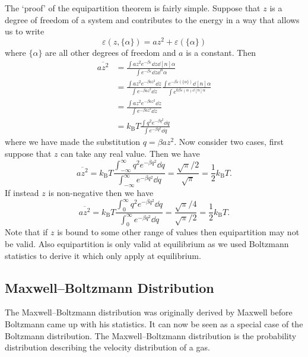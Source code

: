 \documentclass[a4paper]{article}
\newcommand{\boltzmann}{k_\mathrm{B}}
\newcommand{\mean}[1]{\overline{#1}}
\begin{document}
    The `proof' of the equipartition theorem is fairly simple.
    Suppose that \(z\) is a degree of freedom of a system and contributes to the energy in a way that allows us to write
    \[\varepsilon(z, \{\alpha\}) = az^2 + \varepsilon(\{\alpha\})\]
    where \(\{\alpha\}\) are all other degrees of freedom and \(a\) is a constant.
    Then
    \begin{align*}
        \mean{az^2} &= \frac{\int az^2e^{-\beta\varepsilon}\dd{z}\dd[n]{\alpha}}{\int e^{-\beta\varepsilon}\dd{z}\dd^n{\alpha}}\\
        &= \frac{\int az^2e^{-\beta az^2}\dd{z}}{\int e^{-\beta az^2}\dd{z}} \frac{\int e^{-\beta\varepsilon(\{\alpha\})}\dd[n]{\alpha}}{\int e^{0\beta \varepsilon(\alpha)\dd[n]{\alpha}}}\\
        &= \frac{\int az^2e^{-\beta az^2}\dd{z}}{\int e^{-\beta az^2}\dd{z}}\\
        &= \boltzmann T \frac{\int q^2e^{-\beta q^2}\dd{q}}{\int e^{-\beta q^2}\dd{q}}
    \end{align*}
    where we have made the substitution \(q = \beta az^2\).
    Now consider two cases, first suppose that \(z\) can take any real value.
    Then we have
    \[\mean{az^2} = \boltzmann T\frac{\int_{-\infty}^{\infty} q^2e^{-\beta q^2}\dd{q}}{\int_{-\infty}^{\infty} e^{-\beta q^2}\dd{q}} = \frac{\sqrt{\pi}/2}{\sqrt{\pi}} = \frac{1}{2}\boltzmann T.\]
    If instead \(z\) is non-negative then we have
    \[\mean{az^2} = \boltzmann T\frac{\int_{0}^{\infty} q^2e^{-\beta q^2}\dd{q}}{\int_{0}^{\infty} e^{-\beta q^2}\dd{q}} = \frac{\sqrt{\pi}/4}{\sqrt{\pi}/2} = \frac{1}{2}\boltzmann T.\]
    Note that if \(z\) is bound to some other range of values then equipartition may not be valid.
    Also equipartition is only valid at equilibrium as we used Boltzmann statistics to derive it which only apply at equilibrium.
    
    \subsection{Maxwell--Boltzmann Distribution}
    The Maxwell--Boltzmann distribution was originally derived by Maxwell before Boltzmann came up with his statistics.
    It can now be seen as a special case of the Boltzmann distribution.
    The Maxwell--Boltzmann distribution is the probability distribution describing the velocity distribution of a gas.
    
\end{document}
